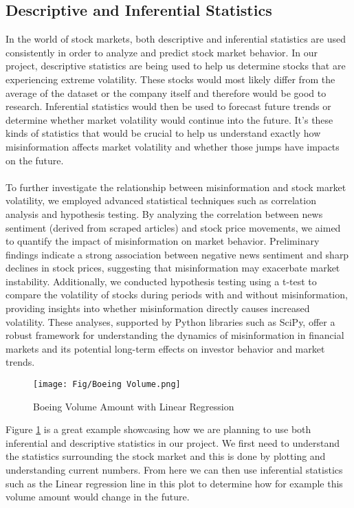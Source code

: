 \documentclass{article}
\begin{document}
\subsection{Descriptive and Inferential Statistics}
In the world of stock markets, both descriptive and inferential statistics are used consistently in order to analyze and predict stock market behavior. In our project, descriptive statistics are being used to help us determine stocks that are experiencing extreme volatility. These stocks would most likely differ from the average of the dataset or the company itself and therefore would be good to research. Inferential statistics would then be used to forecast future trends or determine whether market volatility would continue into the future. It's these kinds of statistics that would be crucial to help us understand exactly how misinformation affects market volatility and whether those jumps have impacts on the future.
\\\\
To further investigate the relationship between misinformation and stock market volatility, we employed advanced statistical techniques such as correlation analysis and hypothesis testing. By analyzing the correlation between news sentiment (derived from scraped articles) and stock price movements, we aimed to quantify the impact of misinformation on market behavior. Preliminary findings indicate a strong association between negative news sentiment and sharp declines in stock prices, suggesting that misinformation may exacerbate market instability. Additionally, we conducted hypothesis testing using a t-test to compare the volatility of stocks during periods with and without misinformation, providing insights into whether misinformation directly causes increased volatility. These analyses, supported by Python libraries such as SciPy, offer a robust framework for understanding the dynamics of misinformation in financial markets and its potential long-term effects on investor behavior and market trends.

\begin{figure}[H]
    \centering
    \texttt{[image: Fig/Boeing Volume.png]}
    \caption{Boeing Volume Amount with Linear Regression}
    \label{fig:Volume_BA}
\end{figure}

Figure \ref{fig:Volume_BA} is a great example showcasing how we are planning to use both inferential and descriptive statistics in our project. We first need to understand the statistics surrounding the stock market and this is done by plotting and understanding current numbers. From here we can then use inferential statistics such as the Linear regression line in this plot to determine how for example this volume amount would change in the future.
\end{document}
